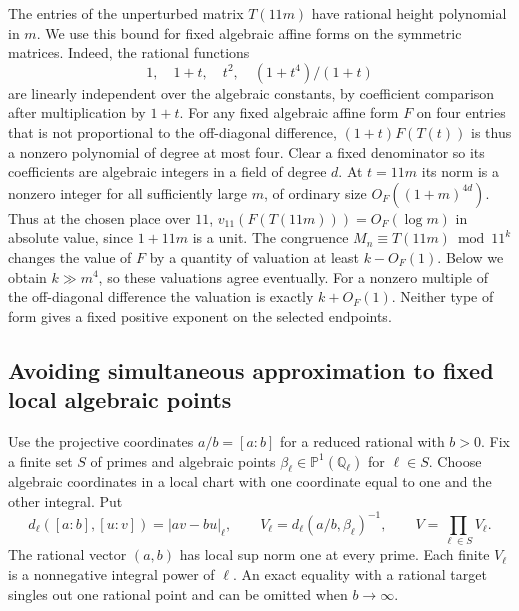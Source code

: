 \documentclass[11pt,a4paper]{article}
\newcommand{\Q}{\mathbb Q}\newcommand{\Z}{\mathbb Z}\newcommand{\PP}{\mathbb P}\newcommand{\SL}{\mathrm{SL}}
\begin{document}
The entries of the unperturbed matrix \(T(11m)\) have rational height polynomial in \(m\). We use this bound for fixed algebraic affine forms on the symmetric matrices. Indeed, the rational functions
\[
 1,\quad 1+t,\quad t^2,\quad (1+t^4)/(1+t)
\]
are linearly independent over the algebraic constants, by coefficient comparison after multiplication by \(1+t\). For any fixed algebraic affine form \(F\) on four entries that is not proportional to the off-diagonal difference, \((1+t)F(T(t))\) is thus a nonzero polynomial of degree at most four. Clear a fixed denominator so its coefficients are algebraic integers in a field of degree \(d\). At \(t=11m\) its norm is a nonzero integer for all sufficiently large \(m\), of ordinary size \(O_F((1+m)^{4d})\). Thus at the chosen place over \(11\), \(v_{11}(F(T(11m)))=O_F(\log m)\) in absolute value, since \(1+11m\) is a unit. The congruence \(M_n\equiv T(11m)\bmod 11^k\) changes the value of \(F\) by a quantity of valuation at least \(k-O_F(1)\). Below we obtain \(k\gg m^4\), so these valuations agree eventually. For a nonzero multiple of the off-diagonal difference the valuation is exactly \(k+O_F(1)\). Neither type of form gives a fixed positive exponent on the selected endpoints.
\subsection{Avoiding simultaneous approximation to fixed local algebraic points}

Use the projective coordinates $a/b=[a:b]$ for a reduced rational
with $b>0$. Fix a finite set $S$ of primes and algebraic points
$\beta_\ell\in\PP^1(\Q_\ell)$ for $\ell\in S$. Choose algebraic coordinates in a local chart with one coordinate equal to one and the other integral. Put
\[
 d_\ell([a:b],[u:v])=|av-bu|_\ell,\qquad
 V_\ell=d_\ell(a/b,\beta_\ell)^{-1},\qquad V=\prod_{\ell\in S}V_\ell .
\]
The rational vector $(a,b)$ has local sup norm one at every prime.
Each finite $V_\ell$ is a nonnegative integral power of $\ell$.
An exact equality with a rational target singles out one rational
point and can be omitted when $b\to\infty$.
\end{document}
